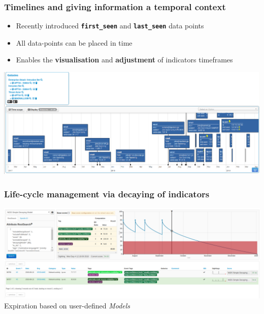 \begin{frame}
  \frametitle{Timelines and giving information a temporal context}
  \begin{itemize}
    \item Recently introduced {\bf \texttt{first\_seen}} and {\bf \texttt{last\_seen}} data points
    \item All data-points can be placed in time
    \item Enables the {\bf visualisation} and {\bf adjustment} of indicators timeframes 
  \end{itemize}
  \begin{center}
    \includegraphics[width=1.0\linewidth]{timeline-misp-overview.png}
  \end{center}
\end{frame}

\begin{frame}
    \frametitle{Life-cycle management via decaying of indicators}
    \includegraphics[width=1.00\linewidth]{decaying-simulation.png}
    Expiration based on user-defined \textit{Models}
\end{frame}

